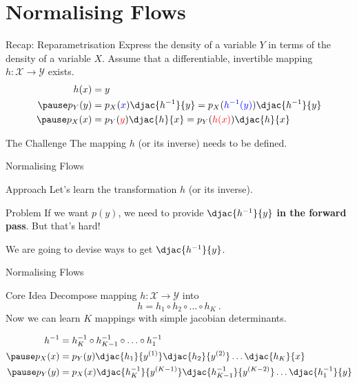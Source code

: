 \documentclass[14pt]{beamer}
\begin{document}
\section{Normalising Flows}

\begin{frame}
\tableofcontents[current]
\end{frame}

\begin{frame}{Recap: Reparametrisation}
Express the density of a variable $ Y $ in terms of the density of a variable $ X $. Assume that a differentiable, invertible mapping
$ h: \mathcal{X} \rightarrow \mathcal{Y} $ exists.
\begin{equation*}
\begin{aligned}
h(x) &= y \\ \pause
p_{Y}(y) &= p_{X}(\textcolor{blue}{x})\djac{h^{-1}}{y} = p_{X}(\textcolor{blue}{h^{-1}(y)})\djac{h^{-1}}{y}  \\ \pause
p_{X}(x) &= p_{Y}(\textcolor{red}{y})\djac{h}{x} = p_{Y}(\textcolor{red}{h(x)})\djac{h}{x}
\end{aligned}
\end{equation*}
\pause
\begin{block}{The Challenge}
The mapping $ h $ (or its inverse) needs to be defined.
\end{block}
\end{frame}

\begin{frame}{Normalising Flows}
\begin{block}{Approach}
Let's learn the transformation $ h $ (or its inverse).
\end{block}
\pause
\begin{block}{Problem}
If we want $ p(y) $, we need to provide $ \djac{h^{-1}}{y} $ \textbf{in the forward pass}. But that's hard!
\end{block}
We are going to devise ways to get $ \djac{h^{-1}}{y} $.
\end{frame}

\begin{frame}{Normalising Flows}
\begin{block}{Core Idea}
Decompose mapping $ h: \mathcal{X} \rightarrow \mathcal{Y} $ into 
\begin{equation*}
h = h_{1}\circ h_{2}\circ\ldots\circ h_K \ .
\end{equation*}
\pause
Now we can learn $ K $ mappings with simple jacobian determinants.
\begin{small}
\pause
\begin{equation*}
\begin{aligned}
h^{-1} &= h_{K}^{-1}\circ h_{K-1}^{-1} \circ \ldots \circ h_{1}^{-1} \\ \pause
p_{X}(x) &= p_{Y}(y) \djac{h_{1}}{y^{(1)}}\djac{h_{2}}{y^{(2)}}\ldots \djac{h_{K}}{x} \\ \pause
p_{Y}(y) &= p_{X}(x)\djac{h_{K}^{-1}}{y^{(K-1)}} \djac{h_{K-1}^{-1}}{y^{(K-2)}}\ldots \djac{h_{1}^{-1}}{y}
\end{aligned}
\end{equation*}
\end{small}
\end{block}
\end{frame}
\end{document}
